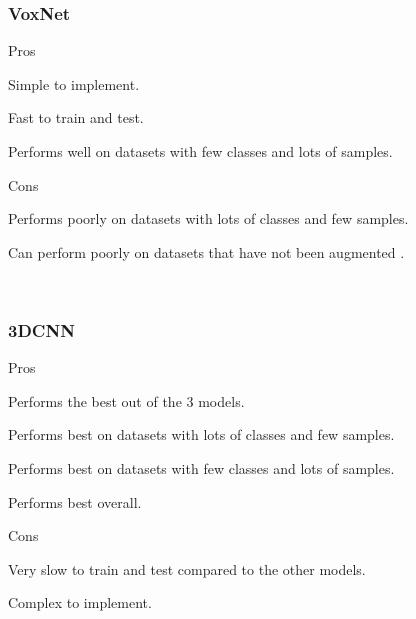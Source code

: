 \documentclass[conference]{IEEEtran}
\begin{document}
\subsubsection{VoxNet}
\begin{list}{}{\leftmargin=1em}
    \item Pros
    \begin{list}{}{\leftmargin=1em}
        \item Simple to implement.
        \item Fast to train and test.
        \item Performs well on datasets with few classes and lots of samples.
    \end{list}
    \item Cons
    \begin{list}{}{\leftmargin=1em}
        \item Performs poorly on datasets with lots of classes and few samples.
        \item Can perform poorly on datasets that have not been augmented \cite{7353481}.
    \end{list}
\end{list}
\
\subsubsection{3DCNN}
\begin{list}{}{\leftmargin=1em}
    \item Pros
    \begin{list}{}{\leftmargin=1em}
        \item Performs the best out of the 3 models.
        \item Performs best on datasets with lots of classes and few samples.
        \item Performs best on datasets with few classes and lots of samples.
        \item Performs best overall.
    \end{list}
    \item Cons
    \begin{list}{}{\leftmargin=1em}
        \item Very slow to train and test compared to the other models.
        \item Complex to implement.
    \end{list}
\end{list}
\
\end{document}

